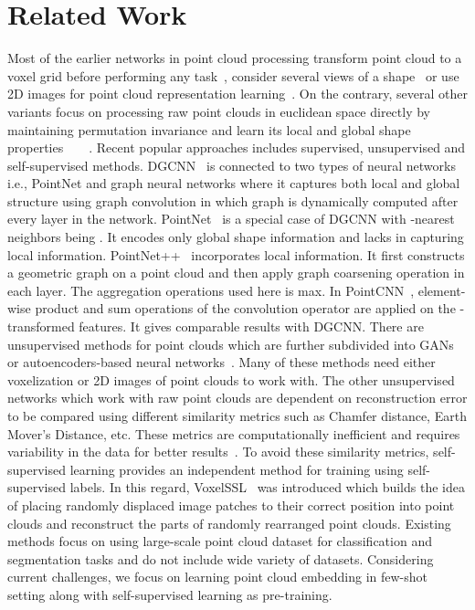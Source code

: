\documentclass{article}
\begin{document}
\section{Related Work}
\label{related}
 Most of the earlier networks in point cloud processing transform point cloud to a voxel grid before performing any task~\cite{wu2016learning}, consider several views of a shape~\cite{su2015multi} or use 2D images for point cloud representation learning~\cite{insafutdinov2018unsupervised}. On the contrary, several other variants focus on processing raw point clouds in euclidean space directly by maintaining permutation invariance and learn its local and global shape properties~\cite{dgcnn}~\cite{qi2017pointnet}~\cite{qi2017pointnet++}~\cite{li2018pointcnn}. Recent popular approaches includes supervised, unsupervised and self-supervised methods. DGCNN~\cite{dgcnn} is connected to two types of neural networks i.e., PointNet and graph neural networks where it captures both local and global structure using graph convolution in which graph is dynamically computed after every layer in the network. PointNet~\cite{qi2017pointnet} is a special case of DGCNN with -nearest neighbors being . It encodes only global shape information and lacks in capturing local information. PointNet++~\cite{qi2017pointnet++} incorporates local information. It first constructs a geometric graph on a point cloud and then apply graph coarsening operation in each layer. The aggregation operations used here is max. In PointCNN~\cite{li2018pointcnn}, element-wise product and sum operations of the convolution operator are applied on the -transformed features. It gives comparable results with DGCNN. There are unsupervised methods for point clouds which are further subdivided into GANs~\cite{achlioptas2018learning}~\cite{han2019view} or autoencoders-based neural networks~\cite{yang2018foldingnet}. Many of these methods need either voxelization or 2D images of point clouds to work with. The other unsupervised networks which work with raw point clouds are dependent on reconstruction error to be compared using different similarity metrics such as Chamfer distance, Earth Mover's Distance, etc. These metrics are computationally inefficient and requires variability in the data for better results~\cite{achlioptas2018learning}. To avoid these similarity metrics, self-supervised learning provides an independent method for training using self-supervised labels. In this regard, VoxelSSL~\cite{sauder2019self} was introduced which builds the idea of placing randomly displaced image patches to their correct position into point clouds and reconstruct the parts of randomly rearranged point clouds. Existing methods focus on using large-scale point cloud dataset for classification and segmentation tasks and do not include wide variety of datasets. Considering current challenges, we focus on learning point cloud embedding in few-shot setting along with self-supervised learning as pre-training.
\fi
\end{document}

